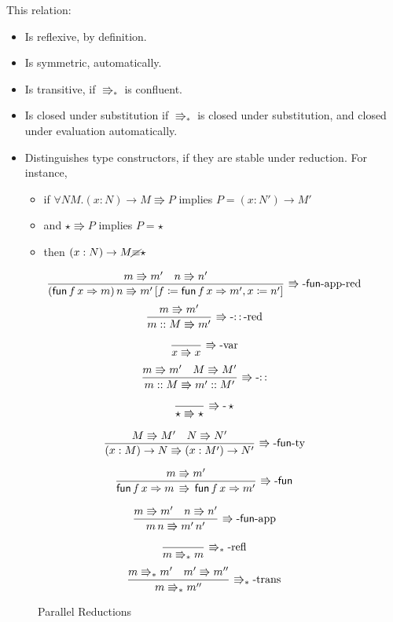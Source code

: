 This relation:
\begin{itemize}
\item Is reflexive, by definition.
\item Is symmetric, automatically.
\item Is transitive, if $\Rrightarrow_{\ast}$ is confluent.
\item Is closed under substitution if $\Rrightarrow_{\ast}$ is closed under substitution, and closed under evaluation automatically.
\item Distinguishes type constructors, if they are stable under reduction.
For instance,
\begin{itemize}
\item if $\forall NM.\left(x:N\right)\rightarrow M\Rrightarrow P$ implies $P=\left(x:N'\right)\rightarrow M'$
\item and $\star\Rrightarrow P$ implies $P=\star$
\item then $\left(x:N\right)\rightarrow M\cancel{\equiv}\star$
\end{itemize}
\end{itemize}
\begin{figure}
\[
\frac{m\Rrightarrow m'\quad n\Rrightarrow n'}{\left(\mathsf{fun}\,f\,x\Rightarrow m\right)n\Rrightarrow m'\left[f\coloneqq\mathsf{fun}\,f\,x\Rightarrow m',x\coloneqq n'\right]}\,\operatorname{\Rrightarrow-\mathsf{fun}-app-red}
\]
\[
\frac{m\Rrightarrow m'}{m::M\Rrightarrow m'}\,\operatorname{\Rrightarrow-::-red}
\]
 
\[
\frac{\,}{x\Rrightarrow x}\,\operatorname{\Rrightarrow-var}
\]
\[
\frac{m\Rrightarrow m'\quad M\Rrightarrow M'}{m::M\Rrightarrow m'::M'}\,\operatorname{\Rrightarrow-::}
\]
 
\[
\frac{\,}{\star\Rrightarrow\star}\,\operatorname{\Rrightarrow-}\star
\]
 
\[
\frac{M\Rrightarrow M'\quad N\Rrightarrow N'}{\left(x:M\right)\rightarrow N\Rrightarrow\left(x:M'\right)\rightarrow N'}\,\operatorname{\Rrightarrow-\mathsf{fun}-ty}
\]
 
\[
\frac{m\Rrightarrow m'}{\mathsf{fun}\,f\,x\Rightarrow m\,\Rrightarrow\,\mathsf{fun}\,f\,x\Rightarrow m'}\,\operatorname{\Rrightarrow-\mathsf{fun}}
\]
 
\[
\frac{m\Rrightarrow m'\quad n\Rrightarrow n'}{m\,n\Rrightarrow m'\,n'}\,\operatorname{\Rrightarrow-\mathsf{fun}-app}
\]
 
\[
\frac{\,}{m\Rrightarrow_{\ast}m}\,\operatorname{\Rrightarrow_{\ast}-refl}
\]
\[
\frac{m\Rrightarrow_{\ast}m'\quad m'\Rrightarrow m''}{m\Rrightarrow_{\ast}m''}\,\operatorname{\Rrightarrow_{\ast}-trans}
\]
 
\caption{\SLang{} Parallel Reductions}
\label{fig:surface-reduction}
\end{figure}

